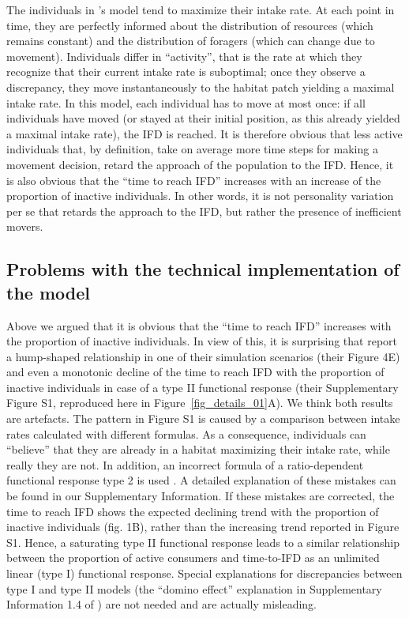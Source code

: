 \begin{interludeenv}
	The individuals in \citeauthor{dinuzzo2020}'s model tend to maximize their intake rate.
	At each point in time, they are perfectly informed about the distribution of resources (which remains constant) and the distribution of foragers (which can change due to movement).
	Individuals differ in ``activity'', that is the rate at which they recognize that their current intake rate is suboptimal; once they observe a discrepancy, they move instantaneously to the habitat patch yielding a maximal intake rate.
	In this model, each individual has to move at most once: if all individuals have moved (or stayed at their initial position, as this already yielded a maximal intake rate), the IFD is reached.
	It is therefore obvious that less active individuals that, by definition, take on average more time steps for making a movement decision, retard the approach of the population to the IFD.
	Hence, it is also obvious that the ``time to reach IFD'' increases with an increase of the proportion of inactive individuals.
	In other words, it is not personality variation per se that retards the approach to the IFD, but rather the presence of inefficient movers.

	\subsection*{Problems with the technical implementation of the model}

	Above we argued that it is obvious that the ``time to reach IFD'' increases with the proportion of inactive individuals.
	In view of this, it is surprising that \citeauthor{dinuzzo2020} report a hump-shaped relationship in one of their simulation scenarios (their Figure 4E) and even a monotonic decline of the time to reach IFD with the proportion of inactive individuals in case of a type II functional response (their Supplementary Figure S1, reproduced here in Figure~\ref{fig_details_01}A).
	We think both results are artefacts.
	The pattern in Figure S1 is caused by a comparison between intake rates calculated with different formulas.
	As a consequence, individuals can “believe” that they are already in a habitat maximizing their intake rate, while really they are not.
	In addition, an incorrect formula of a ratio-dependent functional response type 2 is used \parencite[following][]{abrams2000} .
	A detailed explanation of these mistakes can be found in our Supplementary Information.
	If these mistakes are corrected, the time to reach IFD shows the expected declining trend with the proportion of inactive individuals (fig. 1B), rather than the increasing trend reported in Figure S1.
	Hence, a saturating type II functional response leads to a similar relationship between the proportion of active consumers and time-to-IFD as an unlimited linear (type I) functional response.
	Special explanations for discrepancies between type I and type II models (the ``domino effect'' explanation in Supplementary Information 1.4 of \cite{dinuzzo2020}) are not needed and are actually misleading.
	

\end{interludeenv}
